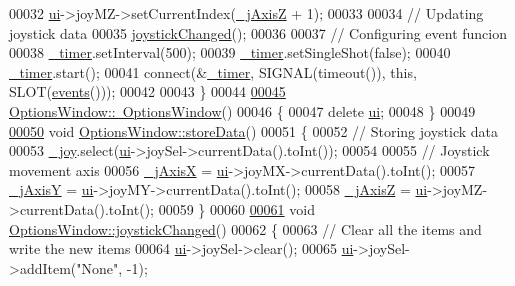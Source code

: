 \begin{DoxyCode}
00032     \hyperlink{a00005_a8347442d5b3b670e8fff0c4102db1f88}{ui}->joyMZ->setCurrentIndex(\hyperlink{a00005_a47409f50a87942706baaea3d025785e3}{\_jAxisZ} + 1);
00033     
00034     \textcolor{comment}{// Updating joystick data}
00035     \hyperlink{a00005_ae8c0373be58da710194f8d14f1c3c4dc}{joystickChanged}();
00036     
00037     \textcolor{comment}{// Configuring event funcion}
00038     \hyperlink{a00005_af6320942b8558140989f552b3bbc1fbd}{\_timer}.setInterval(500);
00039     \hyperlink{a00005_af6320942b8558140989f552b3bbc1fbd}{\_timer}.setSingleShot(\textcolor{keyword}{false});
00040     \hyperlink{a00005_af6320942b8558140989f552b3bbc1fbd}{\_timer}.start();
00041     connect(&\hyperlink{a00005_af6320942b8558140989f552b3bbc1fbd}{\_timer}, SIGNAL(timeout()), \textcolor{keyword}{this}, SLOT(\hyperlink{a00005_a18763ff318688083c7ee5a21f22e8e98}{events}()));
00042     
00043 \}
00044 
\hypertarget{a00017_source_l00045}{}\hyperlink{a00005_a034c885fe8bb4416e732a9571d14a6b4}{00045} \hyperlink{a00005_a034c885fe8bb4416e732a9571d14a6b4}{OptionsWindow::~OptionsWindow}()
00046 \{
00047     \textcolor{keyword}{delete} \hyperlink{a00005_a8347442d5b3b670e8fff0c4102db1f88}{ui};
00048 \}
00049 
\hypertarget{a00017_source_l00050}{}\hyperlink{a00005_ab0a56ad7347c20046602a7a2a1c83397}{00050} \textcolor{keywordtype}{void} \hyperlink{a00005_ab0a56ad7347c20046602a7a2a1c83397}{OptionsWindow::storeData}()
00051 \{
00052     \textcolor{comment}{// Storing joystick data}
00053     \hyperlink{a00005_a1bf846ab681ab245f70adac30999947c}{\_joy}.select(\hyperlink{a00005_a8347442d5b3b670e8fff0c4102db1f88}{ui}->joySel->currentData().toInt());
00054     
00055     \textcolor{comment}{// Joystick movement axis}
00056     \hyperlink{a00005_a01d6284355011203ee6e8856a0bdf557}{\_jAxisX} = \hyperlink{a00005_a8347442d5b3b670e8fff0c4102db1f88}{ui}->joyMX->currentData().toInt();
00057     \hyperlink{a00005_a8921d1cc5bcb527466c28feb5dcc59b1}{\_jAxisY} = \hyperlink{a00005_a8347442d5b3b670e8fff0c4102db1f88}{ui}->joyMY->currentData().toInt();
00058     \hyperlink{a00005_a47409f50a87942706baaea3d025785e3}{\_jAxisZ} = \hyperlink{a00005_a8347442d5b3b670e8fff0c4102db1f88}{ui}->joyMZ->currentData().toInt();
00059 \}
00060 
\hypertarget{a00017_source_l00061}{}\hyperlink{a00005_ae8c0373be58da710194f8d14f1c3c4dc}{00061} \textcolor{keywordtype}{void} \hyperlink{a00005_ae8c0373be58da710194f8d14f1c3c4dc}{OptionsWindow::joystickChanged}()
00062 \{
00063     \textcolor{comment}{// Clear all the items and write the new items}
00064     \hyperlink{a00005_a8347442d5b3b670e8fff0c4102db1f88}{ui}->joySel->clear();
00065     \hyperlink{a00005_a8347442d5b3b670e8fff0c4102db1f88}{ui}->joySel->addItem(\textcolor{stringliteral}{"None"}, -1);

\end{DoxyCode}
